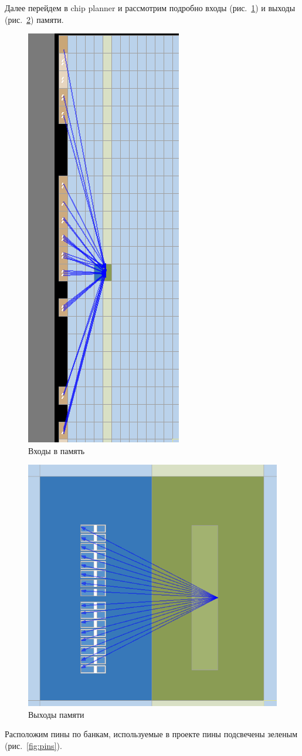 \documentclass[a4paper,14pt]{article}
\begin{document}
Далее перейдем в chip planner и рассмотрим подробно входы (рис.~\ref{fig:mem_in}) и выходы (рис.~\ref{fig:mem_out}) памяти.

\begin{figure}[H]
	\centering
	\includegraphics[width=0.3\linewidth]{image/mem_in}
	\caption{Входы в память}
	\label{fig:mem_in}
\end{figure}

\begin{figure}[H]
	\centering
	\includegraphics[width=0.3\linewidth]{image/mem_out}
	\caption{Выходы памяти}
	\label{fig:mem_out}
\end{figure}

Расположим пины по банкам, используемые в проекте пины подсвечены зеленым (рис.~\ref{fig:pins}).
\end{document}
